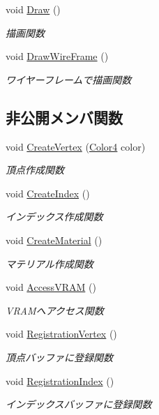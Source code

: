 \begin{DoxyCompactItemize}
void \mbox{\hyperlink{class_cube_polygon_ac9003cd00eea402f2b6c5fb5a77feae2}{Draw}} ()
\begin{DoxyCompactList}\small\item\em 描画関数 \end{DoxyCompactList}\item 
void \mbox{\hyperlink{class_cube_polygon_adceff4ea7cce991c3c16a68178c19057}{Draw\+Wire\+Frame}} ()
\begin{DoxyCompactList}\small\item\em ワイヤーフレームで描画関数 \end{DoxyCompactList}\end{DoxyCompactItemize}
\subsection*{非公開メンバ関数}
\begin{DoxyCompactItemize}
\item 
void \mbox{\hyperlink{class_cube_polygon_ae36048a1ae7b13b6bc8571231b372627}{Create\+Vertex}} (\mbox{\hyperlink{_vector3_d_8h_a9c2339f516cf07ce4753b8a99fab3791}{Color4}} color)
\begin{DoxyCompactList}\small\item\em 頂点作成関数 \end{DoxyCompactList}\item 
void \mbox{\hyperlink{class_cube_polygon_ade2e155c44798710b8e91ac84b02340f}{Create\+Index}} ()
\begin{DoxyCompactList}\small\item\em インデックス作成関数 \end{DoxyCompactList}\item 
void \mbox{\hyperlink{class_cube_polygon_abc3b69a3cb237dec28d0bba9229f0b8d}{Create\+Material}} ()
\begin{DoxyCompactList}\small\item\em マテリアル作成関数 \end{DoxyCompactList}\item 
void \mbox{\hyperlink{class_cube_polygon_a715db255bf7ebd3c3aec2095d73b9399}{Access\+V\+R\+AM}} ()
\begin{DoxyCompactList}\small\item\em V\+R\+A\+Mへアクセス関数 \end{DoxyCompactList}\item 
void \mbox{\hyperlink{class_cube_polygon_adde345ed591e3e81abcffdcac5068f98}{Registration\+Vertex}} ()
\begin{DoxyCompactList}\small\item\em 頂点バッファに登録関数 \end{DoxyCompactList}\item 
void \mbox{\hyperlink{class_cube_polygon_a5a935712a3e3c1e12552aeedf2f409c1}{Registration\+Index}} ()
\begin{DoxyCompactList}\small\item\em インデックスバッファに登録関数 \end{DoxyCompactList}\end{DoxyCompactItemize}
